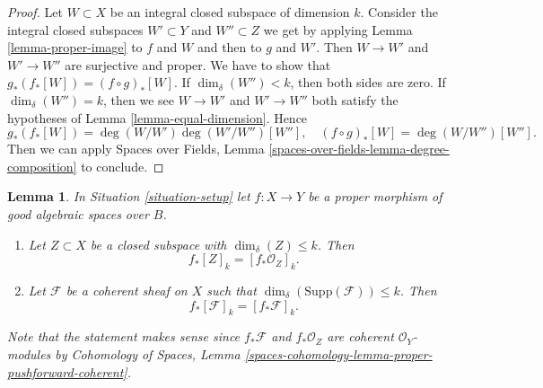\documentclass{stacks-project}
\theoremstyle{plain}
\newtheorem{lemma}[subsection]{Lemma}
\theoremstyle{definition}
\theoremstyle{remark}
\numberwithin{equation}{subsection}
\begin{document}
\begin{proof}
Let $W \subset X$ be an integral closed subspace of dimension $k$.
Consider the integral closed subspaces
$W' \subset Y$ and $W'' \subset Z$
we get by applying Lemma \ref{lemma-proper-image}
to $f$ and $W$ and then to $g$ and $W'$.
Then $W \to W'$ and $W' \to W''$ are surjective and proper.
We have to show that $g_*(f_*[W]) = (f \circ g)_*[W]$.
If $\dim_\delta(W'') < k$, then both sides are zero.
If $\dim_\delta(W'') = k$, then we see $W \to W'$ and $W' \to W''$
both satisfy the hypotheses of Lemma \ref{lemma-equal-dimension}.
Hence
$$
g_*(f_*[W]) = \deg(W/W')\deg(W'/W'')[W''],
\quad
(f \circ g)_*[W] = \deg(W/W'')[W''].
$$
Then we can apply
Spaces over Fields, Lemma \ref{spaces-over-fields-lemma-degree-composition}
to conclude.
\end{proof}

\begin{lemma}
\label{lemma-cycle-push-sheaf}
In Situation \ref{situation-setup} let $f : X \to Y$ be a proper morphism
of good algebraic spaces over $B$.
\begin{enumerate}
\item Let $Z \subset X$ be a closed subspace with $\dim_\delta(Z) \leq k$.
Then
$$
f_*[Z]_k = [f_*{\mathcal O}_Z]_k.
$$
\item Let $\mathcal{F}$ be a coherent sheaf on $X$ such that
$\dim_\delta(\text{Supp}(\mathcal{F})) \leq k$. Then
$$
f_*[\mathcal{F}]_k = [f_*{\mathcal F}]_k.
$$
\end{enumerate}
Note that the statement makes sense since $f_*\mathcal{F}$ and
$f_*\mathcal{O}_Z$ are coherent $\mathcal{O}_Y$-modules by
Cohomology of Spaces, Lemma
\ref{spaces-cohomology-lemma-proper-pushforward-coherent}.
\end{lemma}
\end{document}
